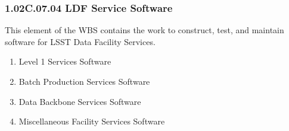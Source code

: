 \subsubsection{1.02C.07.04 LDF Service Software}

This element of the WBS contains the work to construct, test, and maintain software for LSST Data Facility Services.

\begin{enumerate}

  \item{Level 1 Services Software}
  \item{Batch Production Services Software}
  \item{Data Backbone Services Software}
  \item{Miscellaneous Facility Services Software}

\end{enumerate}

